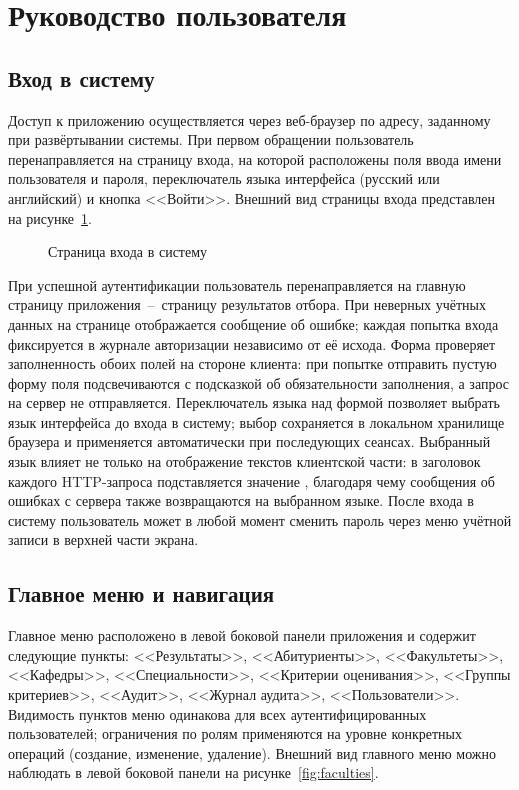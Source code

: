 \section{Руководство пользователя}

\subsection{Вход в систему}

Доступ к приложению осуществляется через веб-браузер по адресу, заданному при развёртывании системы.
При первом обращении пользователь перенаправляется на страницу входа, на которой расположены поля ввода имени пользователя и пароля, переключатель языка интерфейса (русский или английский) и кнопка <<Войти>>.
Внешний вид страницы входа представлен на рисунке~\ref{fig:login}.

\begin{figure}[htbp]
\centering
{}
\caption{Страница входа в систему}
\label{fig:login}
\end{figure}

При успешной аутентификации пользователь перенаправляется на главную страницу приложения~--~страницу результатов отбора.
При неверных учётных данных на странице отображается сообщение об ошибке; каждая попытка входа фиксируется в журнале авторизации независимо от её исхода.
Форма проверяет заполненность обоих полей на стороне клиента: при попытке отправить пустую форму поля подсвечиваются с подсказкой об обязательности заполнения, а запрос на сервер не отправляется.
Переключатель языка над формой позволяет выбрать язык интерфейса до входа в систему; выбор сохраняется в локальном хранилище браузера и применяется автоматически при последующих сеансах.
Выбранный язык влияет не только на отображение текстов клиентской части: в заголовок каждого HTTP-запроса подставляется значение , благодаря чему сообщения об ошибках с сервера также возвращаются на выбранном языке.
После входа в систему пользователь может в любой момент сменить пароль через меню учётной записи в верхней части экрана.

\subsection{Главное меню и навигация}

Главное меню расположено в левой боковой панели приложения и содержит следующие пункты: <<Результаты>>, <<Абитуриенты>>, <<Факультеты>>, <<Кафедры>>, <<Специальности>>, <<Критерии оценивания>>, <<Группы критериев>>, <<Аудит>>, <<Журнал аудита>>, <<Пользователи>>.
Видимость пунктов меню одинакова для всех аутентифицированных пользователей; ограничения по ролям применяются на уровне конкретных операций (создание, изменение, удаление).
Внешний вид главного меню можно наблюдать в левой боковой панели на рисунке~\ref{fig:faculties}.

